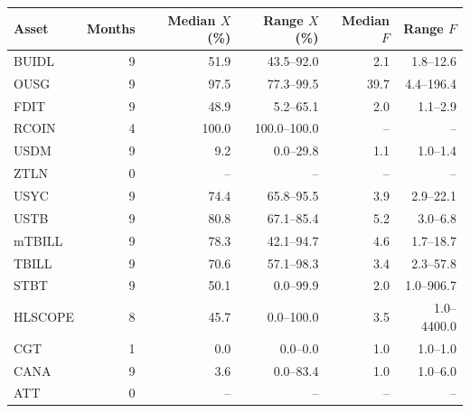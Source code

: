 \begin{tabular}{lrrrrr}
\toprule
Asset & Months & Median $X$ (\%) & Range $X$ (\%) & Median $F$ & Range $F$ \\
\midrule
BUIDL & 9 & 51.9 & 43.5--92.0 & 2.1 & 1.8--12.6 \\
OUSG & 9 & 97.5 & 77.3--99.5 & 39.7 & 4.4--196.4 \\
FDIT & 9 & 48.9 & 5.2--65.1 & 2.0 & 1.1--2.9 \\
RCOIN & 4 & 100.0 & 100.0--100.0 & -- & -- \\
USDM & 9 & 9.2 & 0.0--29.8 & 1.1 & 1.0--1.4 \\
ZTLN & 0 & -- & -- & -- & -- \\
USYC & 9 & 74.4 & 65.8--95.5 & 3.9 & 2.9--22.1 \\
USTB & 9 & 80.8 & 67.1--85.4 & 5.2 & 3.0--6.8 \\
mTBILL & 9 & 78.3 & 42.1--94.7 & 4.6 & 1.7--18.7 \\
TBILL & 9 & 70.6 & 57.1--98.3 & 3.4 & 2.3--57.8 \\
STBT & 9 & 50.1 & 0.0--99.9 & 2.0 & 1.0--906.7 \\
HLSCOPE & 8 & 45.7 & 0.0--100.0 & 3.5 & 1.0--4400.0 \\
CGT & 1 & 0.0 & 0.0--0.0 & 1.0 & 1.0--1.0 \\
CANA & 9 & 3.6 & 0.0--83.4 & 1.0 & 1.0--6.0 \\
ATT & 0 & -- & -- & -- & -- \\
\bottomrule
\end{tabular}
